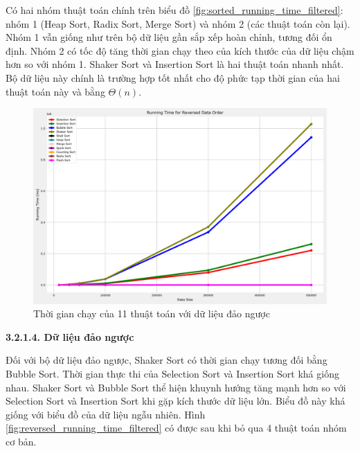 Có hai nhóm thuật toán chính trên biểu đồ \ref{fig:sorted_running_time_filtered}: nhóm 1 (Heap Sort, Radix Sort, Merge Sort) và nhóm 2 (các thuật toán còn lại). Nhóm 1 vẫn giống như trên bộ dữ liệu gần sắp xếp hoàn chỉnh, tương đối ổn định. Nhóm 2 có tốc độ tăng thời gian chạy theo của kích thước của dữ liệu chậm hơn so với nhóm 1. Shaker Sort và Insertion Sort là hai thuật toán nhanh nhất. Bộ dữ liệu này chính là trường hợp tốt nhất cho độ phức tạp thời gian của hai thuật toán này và bằng $\Theta(n)$.


\begin{figure}[H]
    \centering
    \includegraphics[width=\textwidth]{experimental_result/images/reversed_running_time.png}
    \caption{Thời gian chạy của 11 thuật toán với dữ liệu đảo ngược}
    \label{fig:reversed_running_time}
\end{figure}

\textbf{3.2.1.4. Dữ liệu đảo ngược}


Đối với bộ dữ liệu đảo ngược, Shaker Sort có thời gian chạy tương đối bằng Bubble Sort. Thời gian thực thi của Selection Sort và Insertion Sort khá giống nhau. Shaker Sort và Bubble Sort thể hiện khuynh hướng tăng mạnh hơn so với Selection Sort và Insertion Sort khi gặp kích thước dữ liệu lớn. Biểu đồ này khá giống với biểu đồ của dữ liệu ngẫu nhiên. Hình \ref{fig:reversed_running_time_filtered} có được sau khi bỏ qua 4 thuật toán nhóm cơ bản.

